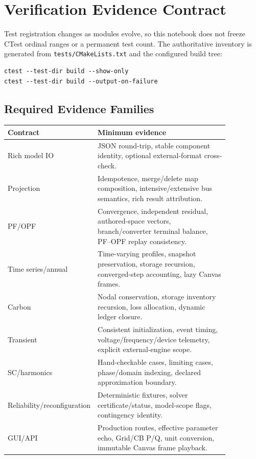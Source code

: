 \section{Verification Evidence Contract}
\label{sec:test_results}

Test registration changes as modules evolve, so this notebook does not freeze
CTest ordinal ranges or a permanent test count.  The authoritative inventory is
generated from \texttt{tests/CMakeLists.txt} and the configured build tree:
\begin{verbatim}
ctest --test-dir build --show-only
ctest --test-dir build --output-on-failure
\end{verbatim}

\subsection{Required Evidence Families}

\begin{longtable}{L{0.24\linewidth}L{0.62\linewidth}}
\toprule
Contract & Minimum evidence \\
\midrule
\endhead
Rich model IO & JSON round-trip, stable component identity, optional external-format cross-check. \\
Projection & Idempotence, merge/delete map composition, intensive/extensive bus semantics, rich result attribution. \\
PF/OPF & Convergence, independent residual, authored-space vectors, branch/converter terminal balance, PF--OPF replay consistency. \\
Time series/annual & Time-varying profiles, snapshot preservation, storage recursion, converged-step accounting, lazy Canvas frames. \\
Carbon & Nodal conservation, storage inventory recursion, loss allocation, dynamic ledger closure. \\
Transient & Consistent initialization, event timing, voltage/frequency/device telemetry, explicit external-engine scope. \\
SC/harmonics & Hand-checkable cases, limiting cases, phase/domain indexing, declared approximation boundary. \\
Reliability/reconfiguration & Deterministic fixtures, solver certificate/status, model-scope flags, contingency identity. \\
GUI/API & Production routes, effective parameter echo, Grid/CB P/Q, unit conversion, immutable Canvas frame playback. \\
\bottomrule
\end{longtable}

